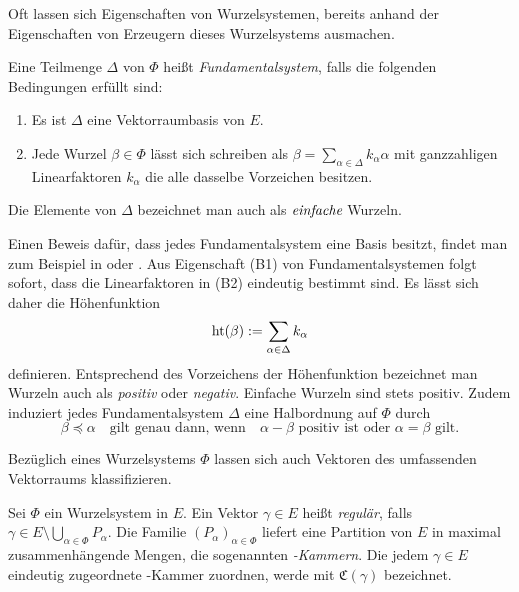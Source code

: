 Oft lassen sich Eigenschaften von Wurzelsystemen, bereits anhand der Eigenschaften von Erzeugern dieses Wurzelsystems ausmachen.

\begin{defn}
  Eine Teilmenge $\Delta$ von $\Phi$ heißt \emph{Fundamentalsystem}, falls die folgenden Bedingungen erfüllt sind:
  \begin{enumerate}[(B1)]
    \item Es ist $\Delta$ eine Vektorraumbasis von $E$.
    \item Jede Wurzel $\beta \in \Phi$ lässt sich schreiben als $\beta = \sum_{\alpha \in \Delta} k_\alpha \alpha$ mit ganzzahligen Linearfaktoren $k_\alpha$ die alle dasselbe Vorzeichen besitzen.
  \end{enumerate}
  Die Elemente von $\Delta$ bezeichnet man auch als $\emph{einfache}$ Wurzeln.
\end{defn}

\begin{bem}
  Einen Beweis dafür, dass jedes Fundamentalsystem eine Basis besitzt, findet man zum Beispiel in \cite[S.48]{humphreys1972introduction} oder \cite[S.116]{erdmann2006introduction}.
  Aus Eigenschaft (B1) von Fundamentalsystemen folgt sofort, dass die Linearfaktoren in (B2) eindeutig bestimmt sind. 
  Es lässt sich daher die Höhenfunktion 
  \begin{displaymath}
    \operatorname{ht}(\beta) := \sum_{\alpha \in \Delta} k_\alpha 
  \end{displaymath}
  definieren.
  Entsprechend des Vorzeichens der Höhenfunktion bezeichnet man Wurzeln auch als \emph{positiv} oder \emph{negativ}.
  Einfache Wurzeln sind stets positiv.
  Zudem induziert jedes Fundamentalsystem $\Delta$ eine Halbordnung auf $\Phi$ durch
  \begin{displaymath}
    \beta \preceq \alpha \quad \text{gilt genau dann, wenn} \quad \alpha - \beta \text{ positiv ist oder } \alpha = \beta \text{ gilt}.
  \end{displaymath}
\end{bem}

Bezüglich eines Wurzelsystems $\Phi$ lassen sich auch Vektoren des umfassenden Vektorraums klassifizieren.

\begin{defn}
  Sei $\Phi$ ein Wurzelsystem in $E$.
  Ein Vektor $\gamma \in E$ heißt \emph{regulär}, falls $\gamma \in E \setminus \bigcup_{\alpha \in \Phi} P_\alpha$.
  Die Familie $(P_\alpha)_{\alpha \in \Phi}$ liefert eine Partition von $E$ in maximal zusammenhängende Mengen, die sogenannten \emph{\weyl-Kammern}.
Die jedem $\gamma \in E$ eindeutig zugeordnete \weyl-Kammer zuordnen, werde mit $\mathfrak{C}(\gamma)$ bezeichnet.
\end{defn}

